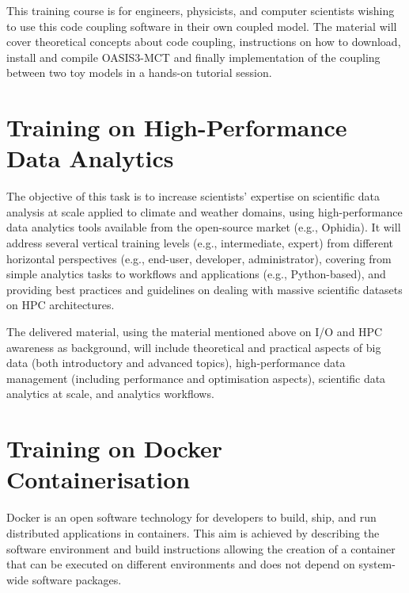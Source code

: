 This training course is for engineers, physicists, and computer scientists wishing to use this code coupling software in their own coupled model.
The material will cover theoretical concepts about code coupling, instructions on how to download, install and compile OASIS3-MCT and finally implementation of the coupling between two toy models in a hands-on tutorial session.

\section{Training on High-Performance Data Analytics}

The objective of this task is to increase scientists' expertise on scientific data analysis at scale applied to climate and weather domains, using high-performance data analytics tools available from the open-source market (e.g., Ophidia). It will address several vertical training levels (e.g., intermediate, expert) from different horizontal perspectives (e.g., end-user, developer, administrator), covering from simple analytics tasks to workflows and applications (e.g., Python-based), and providing best practices and guidelines on dealing with massive scientific datasets on HPC architectures.

The delivered material, using the material mentioned above on I/O and HPC awareness as background, will include
theoretical and practical aspects of big data (both introductory and advanced topics), high-performance data management (including performance and optimisation aspects), scientific data analytics at scale, and analytics workflows.


\section{Training on Docker Containerisation}
\label{sec:tdc}

Docker is an open software technology for developers to build, ship, and run distributed applications in containers. This aim is achieved by describing the software environment and build instructions allowing the creation of a container that can be executed on different environments and does not depend on system-wide software packages.

